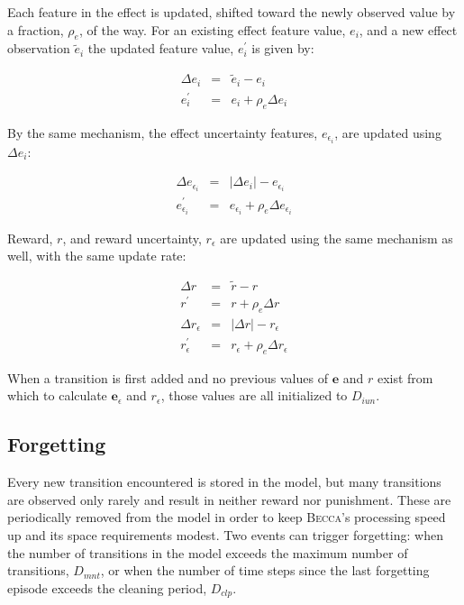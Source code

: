 Each feature in the effect is updated, shifted toward the newly observed value by a fraction, $\rho_e$, of the way. For an existing effect feature value, $e_i$, and a new effect observation $\tilde{e}_i$ the updated feature value, $e^\prime_i$ is given by:

\begin{eqnarray}
\Delta e_i &= &\tilde{e}_i  - e_i \\
e^\prime_i &=& e_i + \rho_e \Delta e_i
\end{eqnarray}

By the same mechanism, the effect uncertainty features, $e_{\epsilon_i}$, are updated using $\Delta e_i$:

\begin{eqnarray}
\Delta e_{\epsilon_i} &=& |\Delta e_i|  - e_{\epsilon_i}\\
e_{\epsilon_i}^\prime &=& e_{\epsilon_i} + \rho_e \Delta e_{\epsilon_i}
\end{eqnarray}

Reward, $r$, and reward uncertainty, $r_\epsilon$ are updated using the same mechanism as well, with the same update rate:

\begin{eqnarray}
\Delta r &= &\tilde{r} - r \\
r^\prime &=& r + \rho_e \Delta r \\
\Delta r_\epsilon &=&|\Delta r| -  r_\epsilon \\
r_\epsilon^\prime &=& r_\epsilon + \rho_e \Delta r_\epsilon
\end{eqnarray}

When a transition is first added and no previous values of $\mathbf{e}$ and $r$ exist from which to calculate  $\mathbf{e}_\epsilon$ and $r_\epsilon$, those values are all initialized to $D_{iun}$. 

\subsection{Forgetting}
Every new transition encountered is stored in the model, but many transitions are observed only rarely and result in neither reward nor punishment. These are periodically removed from the model in order to keep \textsc{Becca}'s processing speed up and its space requirements modest. Two events can trigger forgetting: when the number of transitions in the model exceeds the maximum number of transitions, $D_{mnt}$, or when the number of time steps since the last forgetting episode exceeds the cleaning period, $D_{clp}$.

